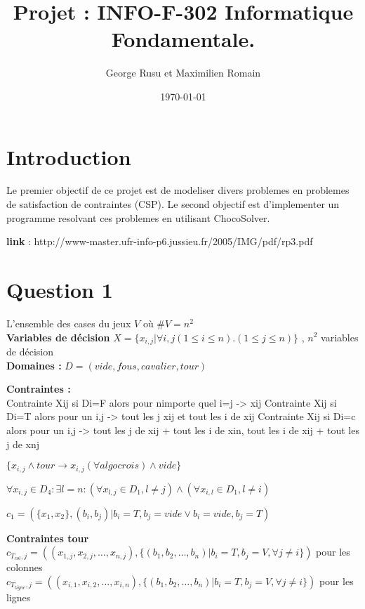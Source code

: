 \documentclass[a4paper,10pt]{article}
\title{Projet : INFO-F-302 Informatique Fondamentale.}
\author{George Rusu et Maximilien Romain}
\date{\today}
\begin{document}
\maketitle
\tableofcontents
\newpage
\section{Introduction}
Le premier objectif de ce projet est de modeliser divers problemes en problemes de satisfaction de contraintes (CSP). Le second objectif est d’implementer un programme resolvant ces problemes en utilisant ChocoSolver.

\textbf{link} :  http://www-master.ufr-info-p6.jussieu.fr/2005/IMG/pdf/rp3.pdf

\section{Question 1}
L'ensemble des cases du jeux $V$ où $ \#V = n^2$ \\
\textbf {Variables de décision} $ X = \{x_{i,j} | \forall i,j (1 \leq i \leq n).(1 \leq j \leq n)\}$ , $n^2$ variables de décision \\
\textbf{Domaines : }
$ D = (vide, fous, cavalier, tour) $

\textbf{Contraintes : }\\
Contrainte{ Xij si Di=F alors {pour nimporte quel i=j -> xij}}
Contrainte{ Xij si Di=T alors {pour un i,j -> tout les j xij et tout les i de xij}}
Contrainte{ Xij si Di=c alors {pour un i,j -> tout les j de xij + tout les i de xin, tout les i de xij + tout les j de xnj}}

$ \{ x_{i,j} \wedge tour \rightarrow x_{i,j} (\forall algo crois) \wedge vide \} $

$\forall x_{i,j} \in D_4 : \exists l=n : (\forall x_{l,j} \in D_1, l \neq j) \wedge (\forall x_{i,l} \in D_1, l \neq i)$

$ c_1 = (\{x_1, x_2\},(b_i, b_j)| b_i = T, b_j = vide \lor b_i = vide, b_j = T) $

\textbf{Contraintes tour}\\
$ c_{T_{col},j} = ((x_{1,j}, x_{2,j},\ldots, x_{n,j}), \{(b_1, b_2,\ldots, b_n) | b_i = T, b_j = V, \forall j \ne i\})$ pour les colonnes \\
$ c_{T_{ligne},j} = ((x_{i,1}, x_{i,2},\ldots, x_{i,n}), \{(b_1, b_2,\ldots, b_n) | b_i = T, b_j = V, \forall j \ne i\})$ pour les lignes
\end{document}
